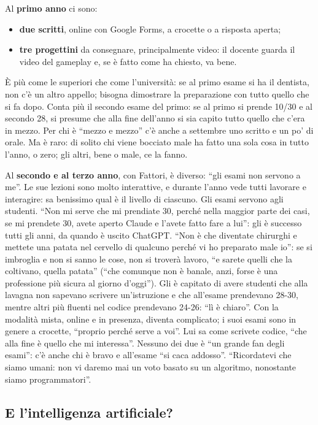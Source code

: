 Al \textbf{primo anno} ci sono:
\begin{itemize}
  \item \textbf{due scritti}, online con Google Forms, a crocette o a risposta
        aperta;
  \item \textbf{tre progettini} da consegnare, principalmente video: il
        docente guarda il video del gameplay e, se è fatto come ha chiesto, va
        bene.
\end{itemize}
È più come le superiori che come l'università: se al primo esame si ha il
dentista, non c'è un altro appello; bisogna dimostrare la preparazione con
tutto quello che si fa dopo. Conta più il secondo esame del primo: se al primo
si prende 10/30 e al secondo 28, si presume che alla fine dell'anno si sia
capito tutto quello che c'era in mezzo. Per chi è ``mezzo e mezzo'' c'è anche
a settembre uno scritto e un po' di orale. Ma è raro: di solito chi viene
bocciato male ha fatto una sola cosa in tutto l'anno, o zero; gli altri,
bene o male, ce la fanno.

Al \textbf{secondo e al terzo anno}, con Fattori, è diverso: ``gli esami non
servono a me''. Le sue lezioni sono molto interattive, e durante l'anno vede
tutti lavorare e interagire: sa benissimo qual è il livello di ciascuno. Gli
esami servono agli studenti. ``Non mi serve che mi prendiate 30, perché nella
maggior parte dei casi, se mi prendete 30, avete aperto Claude e l'avete fatto
fare a lui'': gli è successo tutti gli anni, da quando è uscito ChatGPT. ``Non
è che diventate chirurghi e mettete una patata nel cervello di qualcuno perché
vi ho preparato male io'': se si imbroglia e non si sanno le cose, non si
troverà lavoro, ``e sarete quelli che la coltivano, quella patata'' (``che
comunque non è banale, anzi, forse è una professione più sicura al giorno
d'oggi''). Gli è capitato di avere studenti che alla lavagna non sapevano
scrivere un'istruzione e che all'esame prendevano 28-30, mentre altri più
fluenti nel codice prendevano 24-26: ``lì è chiaro''. Con la modalità mista,
online e in presenza, diventa complicato; i suoi esami sono in genere a
crocette, ``proprio perché serve a voi''. Lui sa come scrivete codice, ``che
alla fine è quello che mi interessa''. Nessuno dei due è ``un grande fan degli
esami'': c'è anche chi è bravo e all'esame ``si caca addosso''. ``Ricordatevi
che siamo umani: non vi daremo mai un voto basato su un algoritmo, nonostante
siamo programmatori''.

\subsection{E l'intelligenza artificiale?}

